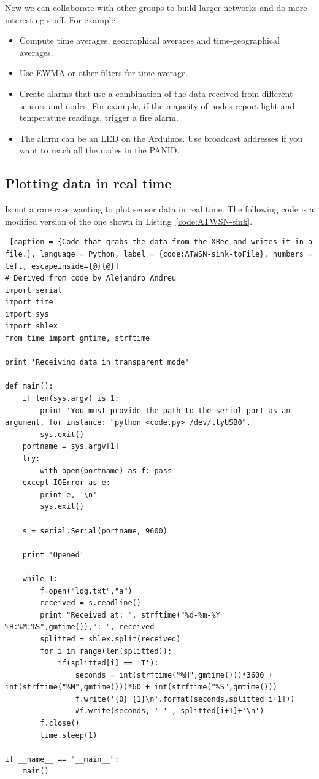 Now we can collaborate with other groups to build larger networks and do more interesting stuff.
For example
\begin{itemize}
\item Compute time averages, geographical averages and time-geographical averages.
\item Use EWMA or other filters for time average.
\item Create alarms that use a combination of the data received from different sensors and nodes. 
For example, if the majority of nodes report light and temperature readings, trigger a fire alarm.
\item The alarm can be an LED on the Arduinos.
Use broadcast addresses if you want to reach all the nodes in the PANID.
\end{itemize}

\subsection*{Plotting data in real time}
Is not a rare case wanting to plot sensor data in real time. The following code is a modified version of the one shown in Listing~\ref{code:ATWSN-sink}.

\begin{lstlisting} [caption = {Code that grabs the data from the XBee and writes it in a file.}, language = Python, label = {code:ATWSN-sink-toFile}, numbers = left, escapeinside={@}{@}]
# Derived from code by Alejandro Andreu
import serial
import time
import sys
import shlex
from time import gmtime, strftime

print 'Receiving data in transparent mode'

def main():
    if len(sys.argv) is 1:
        print 'You must provide the path to the serial port as an argument, for instance: "python <code.py> /dev/ttyUSB0".'
        sys.exit()
    portname = sys.argv[1]
    try:
        with open(portname) as f: pass
    except IOError as e:
        print e, '\n'
        sys.exit()

    s = serial.Serial(portname, 9600)

    print 'Opened'

    while 1:
        f=open("log.txt","a")
        received = s.readline()
        print "Received at: ", strftime("%d-%m-%Y %H:%M:%S",gmtime()),": ", received
        splitted = shlex.split(received)
        for i in range(len(splitted)):
            if(splitted[i] == 'T'):
                seconds = int(strftime("%H",gmtime()))*3600 + int(strftime("%M",gmtime()))*60 + int(strftime("%S",gmtime()))
                f.write('{0} {1}\n'.format(seconds,splitted[i+1]))
                #f.write(seconds, ' ' , splitted[i+1]+'\n')
        f.close()
        time.sleep(1)

if __name__ == "__main__":
    main()
\end{lstlisting}

